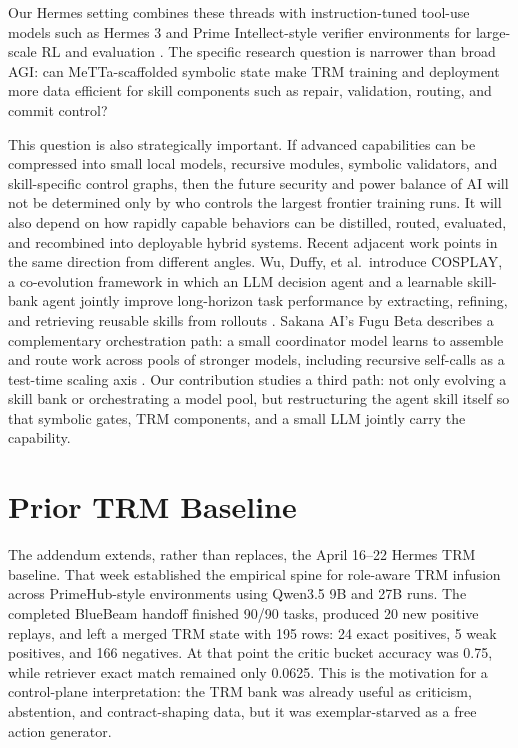 \documentclass[11pt]{article}
\begin{document}
Our Hermes setting combines these threads with instruction-tuned tool-use models such as Hermes 3 \citep{teknium2024hermes3} and Prime Intellect-style verifier environments for large-scale RL and evaluation \citep{primeintellect2025intellect3}. The specific research question is narrower than broad AGI: can MeTTa-scaffolded symbolic state make TRM training and deployment more data efficient for skill components such as repair, validation, routing, and commit control?

This question is also strategically important. If advanced capabilities can be compressed into small local models, recursive modules, symbolic validators, and skill-specific control graphs, then the future security and power balance of AI will not be determined only by who controls the largest frontier training runs. It will also depend on how rapidly capable behaviors can be distilled, routed, evaluated, and recombined into deployable hybrid systems. Recent adjacent work points in the same direction from different angles. Wu, Duffy, et al.\ introduce COSPLAY, a co-evolution framework in which an LLM decision agent and a learnable skill-bank agent jointly improve long-horizon task performance by extracting, refining, and retrieving reusable skills from rollouts \citep{wu2026cosplay}. Sakana AI's Fugu Beta describes a complementary orchestration path: a small coordinator model learns to assemble and route work across pools of stronger models, including recursive self-calls as a test-time scaling axis \citep{sakana2026fugu}. Our contribution studies a third path: not only evolving a skill bank or orchestrating a model pool, but restructuring the agent skill itself so that symbolic gates, TRM components, and a small LLM jointly carry the capability.

\section{Prior TRM Baseline}

The addendum extends, rather than replaces, the April 16--22 Hermes TRM baseline. That week established the empirical spine for role-aware TRM infusion across PrimeHub-style environments using Qwen3.5 9B and 27B runs. The completed BlueBeam handoff finished 90/90 tasks, produced 20 new positive replays, and left a merged TRM state with 195 rows: 24 exact positives, 5 weak positives, and 166 negatives. At that point the critic bucket accuracy was 0.75, while retriever exact match remained only 0.0625. This is the motivation for a control-plane interpretation: the TRM bank was already useful as criticism, abstention, and contract-shaping data, but it was exemplar-starved as a free action generator.
\end{document}
